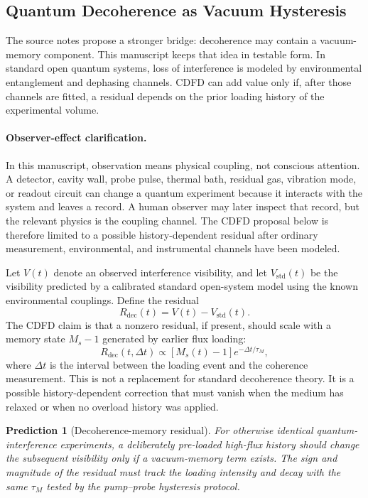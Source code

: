 \documentclass[11pt]{article}
\newtheorem{prediction}{Prediction}
\begin{document}
\subsection{Quantum Decoherence as Vacuum Hysteresis}

The source notes propose a stronger bridge: decoherence may contain a
vacuum-memory component. This manuscript keeps that idea in testable form. In
standard open quantum systems, loss of interference is modeled by environmental
entanglement and dephasing channels. CDFD can add value only if, after those
channels are fitted, a residual depends on the prior loading history of the
experimental volume.

\paragraph{Observer-effect clarification.}
In this manuscript, observation means physical coupling, not conscious attention.
A detector, cavity wall, probe pulse, thermal bath, residual gas, vibration
mode, or readout circuit can change a quantum experiment because it interacts
with the system and leaves a record. A human observer may later inspect that
record, but the relevant physics is the coupling channel. The CDFD proposal below
is therefore limited to a possible history-dependent residual after ordinary
measurement, environmental, and instrumental channels have been modeled.

Let $V(t)$ denote an observed interference visibility, and let
$V_{\mathrm{std}}(t)$ be the visibility predicted by a calibrated standard
open-system model using the known environmental couplings. Define the residual
\begin{equation}
    R_{\mathrm{dec}}(t)
    =
    V(t)-V_{\mathrm{std}}(t).
\end{equation}
The CDFD claim is that a nonzero residual, if present, should scale with a
memory state $M_s-1$ generated by earlier flux loading:
\begin{equation}
    R_{\mathrm{dec}}(t,\Delta t)
    \propto
    \left[M_s(t)-1\right]e^{-\Delta t/\tau_M},
\end{equation}
where $\Delta t$ is the interval between the loading event and the coherence
measurement. This is not a replacement for standard decoherence theory. It is a
possible history-dependent correction that must vanish when the medium has
relaxed or when no overload history was applied.

\begin{prediction}[Decoherence-memory residual]
For otherwise identical quantum-interference experiments, a deliberately
pre-loaded high-flux history should change the subsequent visibility only if a
vacuum-memory term exists. The sign and magnitude of the residual must track
the loading intensity and decay with the same $\tau_M$ tested by the
pump--probe hysteresis protocol.
\end{prediction}
\end{document}
